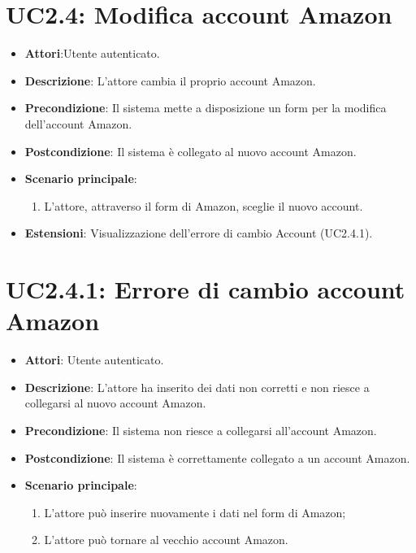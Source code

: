 \section{UC2.4: Modifica account Amazon}
\label{UC2.4}
\begin{itemize}
	\item \textbf{Attori}:Utente autenticato.
	\item \textbf{Descrizione}: L'attore cambia il proprio account Amazon.
	\item \textbf{Precondizione}: Il sistema mette a disposizione un form per la modifica dell'account Amazon.
	\item \textbf{Postcondizione}: Il sistema è collegato al nuovo account Amazon.
	\item \textbf{Scenario principale}:
	\begin{enumerate} \item L'attore, attraverso il form di Amazon, sceglie il nuovo account.\end{enumerate}
	\item \textbf{Estensioni}:
	Visualizzazione dell'errore di cambio Account (UC2.4.1).
\end{itemize}

\section{UC2.4.1: Errore di cambio account Amazon}
\label{UC2.4.1}
\begin{itemize}
	\item \textbf{Attori}: Utente autenticato.
	\item \textbf{Descrizione}: L'attore ha inserito dei dati non corretti e non riesce a collegarsi al nuovo account Amazon.
	\item \textbf{Precondizione}: Il sistema non riesce a collegarsi all'account Amazon.
	\item \textbf{Postcondizione}: Il sistema è correttamente collegato a un account Amazon.
	\item \textbf{Scenario principale}:
	\begin{enumerate} \item L'attore può inserire nuovamente i dati nel form di Amazon;  \item  L'attore può tornare al vecchio account Amazon.\end{enumerate}
\end{itemize}

